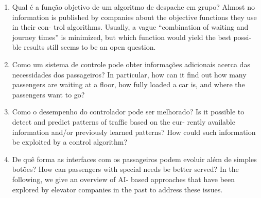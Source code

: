 \begin{enumerate}
\item Qual é a função objetivo de um algoritmo de despache em grupo? \hfill \newline
      Almost no information is published by companies about the objective functions they use in their con- trol algorithms. Usually, a vague “combination of waiting and journey times” is minimized, but which function would yield the best possi- ble results still seems to be an open question.

\item Como um sistema de controle pode obter informações adicionais acerca das necessidades dos passageiros?\hfill \newline
      In particular, how can it find out how many passengers are waiting at a floor, how fully loaded a car is, and where the passengers want to go?

\item Como o desempenho do controlador pode ser melhorado? \hfill \newline
      Is it possible to detect and predict patterns of traffic based on the cur- rently available information and/or previously learned patterns? How could such information be exploited by a control algorithm?

\item De quê forma as interfaces com os passageiros podem evoluir além de simples botões? \hfill \newline
      How can passengers with special needs be better served? In the following, we give an overview of AI- based approaches that have been explored by elevator companies in the past to address these issues.
\end{enumerate}